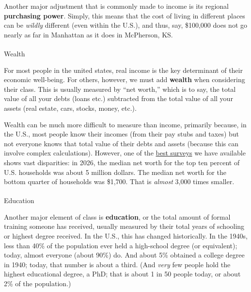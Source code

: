 \documentclass[
  letterpaper,
  DIV=11,
  numbers=noendperiod,
  oneside]{scrartcl}
\makeatletter
\let\oldparagraph\paragraph
\renewcommand{\paragraph}{
    \@ifstar
      \xxxParagraphStar
      \xxxParagraphNoStar
  }
\newcommand{\xxxParagraphStar}[1]{\oldparagraph*{#1}\mbox{}}
\newcommand{\xxxParagraphNoStar}[1]{\oldparagraph{#1}\mbox{}}
\makeatother
\begin{document}
Another major adjustment that is commonly made to income is its regional
\textbf{purchasing power}. Simply, this means that the cost of living in
different places can be \emph{wildly} different (even within the U.S.),
and thus, say, \$100,000 does not go nearly as far in Manhattan as it
does in McPherson, KS.

\paragraph{Wealth}\label{wealth}

For most people in the united states, real income is the key determinant
of their economic well-being. For others, however, we must add
\textbf{wealth} when considering their class. This is usually measured
by ``net worth,'' which is to say, the total value of all your debts
(loans etc.) subtracted from the total value of all your assets (real
estate, cars, stocks, money, etc.).

Wealth can be much more difficult to measure than income, primarily
because, in the U.S., most people know their incomes (from their pay
stubs and taxes) but not everyone knows that total value of their debts
and assets (because this can involve complex calculations). However, one
of the
\href{https://www.federalreserve.gov/publications/files/scf26.pdf}{best
surveys} we have available shows vast disparities: in 2026, the median
net worth for the top ten percent of U.S. households was about 5 million
dollars. The median net worth for the bottom quarter of households was
\$1,700. That is \emph{almost} 3,000 times smaller.

\paragraph{Education}\label{education}

Another major element of class is \textbf{education}, or the total
amount of formal training someone has received, usually measured by
their total years of schooling or highest degree received. In the U.S.,
this has changed historically. In the 1940s, less than 40\% of the
population ever held a high-school degree (or equivalent); today, almost
everyone (about 90\%) do. And about 5\% obtained a college degree in
1940; today, that number is about a third. (And \emph{very} few people
hold the highest educational degree, a PhD; that is about 1 in 50 people
today, or about 2\% of the population.)
\end{document}
